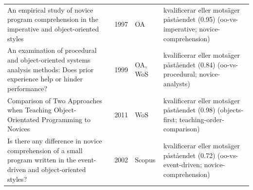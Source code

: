 \begin{longtable}{@{}%
  >{\raggedright\arraybackslash}p{}c%
  >{\raggedright\arraybackslash}p{}%
  >{\raggedright\arraybackslash}p{}@{}}
An empirical study of novice program comprehension in the imperative and object-oriented styles & 1997 & OA & kvalificerar eller motsäger påståendet (0.95) (oo-vs-imperative; novice-comprehension) \\
An examination of procedural and object-oriented systems analysis methods: Does prior experience help or hinder performance? & 1999 & OA, WoS & kvalificerar eller motsäger påståendet (0.84) (oo-vs-procedural; novice-analysts) \\
Comparison of Two Approaches when Teaching Object-Orientated Programming to Novices & 2011 & WoS & kvalificerar eller motsäger påståendet (0.98) (objects-first; teaching-order-comparison) \\
Is there any difference in novice comprehension of a small program written in the event-driven and object-oriented styles? & 2002 & Scopus & kvalificerar eller motsäger påståendet (0.72) (oo-vs-event-driven; novice-comprehension) \\
\end{longtable}
\endgroup
